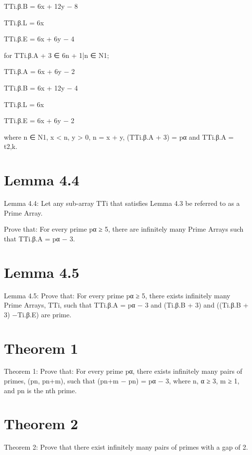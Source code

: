 TTi.β.B = 6x + 12y − 8 

TTi.β.L = 6x

TTi.β.E = 6x + 6y − 4

for TTi.β.A + 3 ∈ {6n + 1|n ∈ N1};

TTi.β.A = 6x + 6y − 2 

TTi.β.B = 6x + 12y − 4 

TTi.β.L = 6x 

TTi.β.E = 6x + 6y − 2

where n ∈ N1, x < n, y > 0, n = x + y, (TTi.β.A + 3) = pα and TTi.β.A = t2,k.

\chapter{Lemma 4.4}

Lemma 4.4: Let any sub-array TTi that satisfies Lemma 4.3 be referred to as a Prime Array.

Prove that: For every prime pα ≥ 5, there are infinitely many Prime Arrays such that TTi.β.A = pα − 3.

\chapter{Lemma 4.5}

Lemma 4.5: Prove that: For every prime pα ≥ 5, there exists infinitely many Prime Arrays, TTi, such that TTi.β.A = pα − 3 and (Ti.β.B + 3) and ((Ti.β.B + 3) −Ti.β.E) are prime.

\chapter{Theorem 1}

Theorem 1: Prove that: For every prime pα, there exists infinitely many pairs of primes, (pn, pn+m), such that (pn+m − pn) = pα − 3, where n, α ≥ 3, m ≥ 1, and pn is the nth prime.

\chapter{Theorem 2}

Theorem 2: Prove that there exist infinitely many pairs of primes with a gap of 2.






\printbibliography














